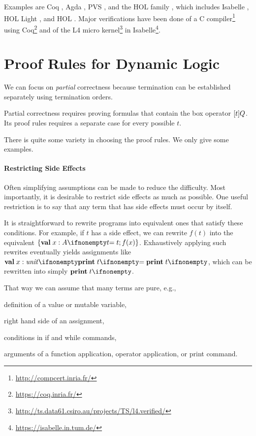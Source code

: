 Examples are Coq \cite{coq}, Agda \cite{agda}, PVS \cite{pvs}, and the HOL family \cite{holsemantics}, which includes Isabelle \cite{isabelle}, HOL Light \cite{hollight}, and HOL \cite{hol}.
Major verifications have been done of a C compiler\footnote{\url{http://compcert.inria.fr/}} using Coq\footnote{\url{https://coq.inria.fr/}} and of the L4 micro kernel\footnote{\url{http://ts.data61.csiro.au/projects/TS/l4.verified/}} in Isabelle\footnote{\url{https://isabelle.in.tum.de/}}.

\section{Proof Rules for Dynamic Logic}

We can focus on \emph{partial} correctness because termination can be established separately using termination orders.

Partial correctness requires proving formulas that contain the box operator $[t]Q$.
Its proof rules requires a separate case for every possible $t$.

There is quite some variety in choosing the proof rules.
We only give some examples.

\paragraph{Restricting Side Effects}
Often simplifying assumptions can be made to reduce the difficulty.
Most importantly, it is desirable to restrict side effects as much as possible.
One useful restriction is to say that any term that has side effects must occur by itself.

It is straightforward to rewrite programs into equivalent ones that satisfy these conditions.
For example, if $t$ has a side effect, we can rewrite $f(t)$ into the equivalent $\{\aval{x}{A}{t};f(x)\}$.
Exhaustively applying such rewrites eventually yields assignments like $\aval{x}{\Unit}{\aprint{t}}$, which can be rewritten into simply $\aprint{t}$.

That way we can assume that many terms are pure, e.g.,
\begin{compactitem}
 \item definition of a value or mutable variable,
 \item right hand side of an assignment,
 \item conditions in if and while commands,
 \item arguments of a function application, operator application, or print command.
\end{compactitem}

